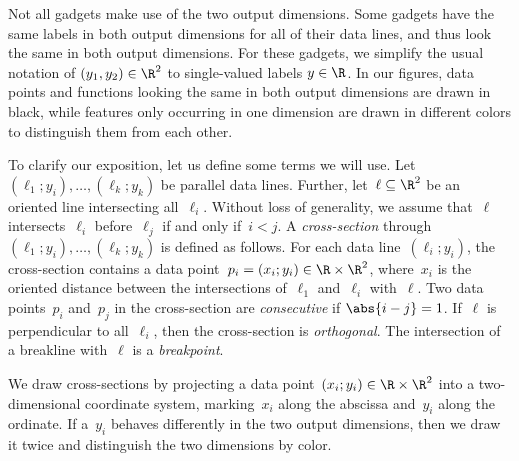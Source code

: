\documentclass{toc}
\begin{document}
Not all gadgets make use of the two output dimensions.
Some gadgets have the same labels in both output dimensions for all of their data lines, and thus look the same in both output dimensions.
For these gadgets, we simplify the usual notation of $(y_1,y_2) \in \R^2$ to single-valued labels $y \in \R$.
In our figures, data points and functions looking the same in both output dimensions are drawn in black, while features only occurring in one dimension are drawn in different colors to distinguish them from each other.

To clarify our exposition, let us define some terms we will use.
Let $(\ell_1; y_i), \ldots, (\ell_k; y_k)$ be parallel data lines.
Further, let~$\ell \subseteq \R^2$ be an oriented line intersecting all~$\ell_i$.
Without loss of generality, we assume that~$\ell$ intersects~$\ell_i$ before~$\ell_j$ if and only if~$i < j$.
A \emph{cross-section} through $(\ell_1; y_i), \ldots, (\ell_k; y_k)$ is defined as 
follows. %
For each data line~$(\ell_i; y_i)$, the cross-section contains a data point~$p_i = (x_i; y_i) \in \R \times \R^2$, where~$x_i$ is the oriented distance between the intersections of~$\ell_1$ and~$\ell_i$ with~$\ell$.
Two data points~$p_i$ and~$p_j$ in the cross-section are \emph{consecutive} if $\abs{i - j} = 1$.
If~$\ell$ is perpendicular to all~$\ell_i$, then the cross-section is \emph{orthogonal}.
The intersection of a breakline with~$\ell$ is a \emph{breakpoint}.

We draw cross-sections by projecting a data point~$(x_i; y_i) \in \R \times \R^2$ into a two-dimensional coordinate system, marking~$x_i$ along the abscissa and~$y_i$ along the ordinate.
If a~$y_i$ behaves differently in the two output dimensions, then we draw it twice and distinguish the two dimensions by color.

\end{document}
